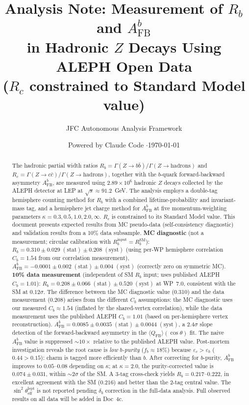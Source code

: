 \documentclass[11pt,a4paper]{article}
\title{Analysis Note: Measurement of $R_b$ and $A_\mathrm{FB}^b$\\
in Hadronic $Z$ Decays Using ALEPH Open Data\\
{\normalsize ($R_c$ constrained to Standard Model value)}}
\author{JFC Autonomous Analysis Framework}
\date{Powered by Claude Code \quad$\cdot$\quad \today}
\begin{document}
\maketitle

\begin{abstract}
The hadronic partial width ratios $R_b = \Gamma(Z \to b\bar{b})/\Gamma(Z \to \mathrm{hadrons})$
and $R_c = \Gamma(Z \to c\bar{c})/\Gamma(Z \to \mathrm{hadrons})$, together with the
$b$-quark forward-backward asymmetry $A_\mathrm{FB}^b$, are measured using $2.89 \times 10^6$
hadronic $Z$ decays collected by the ALEPH detector at LEP at $\sqrt{s} \approx 91.2$~GeV.
The analysis employs a double-tag hemisphere counting method for $R_b$ with a combined
lifetime-probability and invariant-mass tag, and a hemisphere jet charge method for
$A_\mathrm{FB}^b$ at five momentum-weighting parameters $\kappa = 0.3, 0.5, 1.0, 2.0, \infty$.
$R_c$ is constrained to its Standard Model value.
This document presents expected results from MC pseudo-data (self-consistency diagnostic)
and validation results from a 10\% data subsample.
\textbf{MC diagnostic} (not a measurement; circular calibration with $R_b^\mathrm{input} = R_b^\mathrm{SM}$):
$R_b = 0.310 \pm 0.029\;\mathrm{(stat)} \pm 0.208\;\mathrm{(syst)}$
(using per-WP hemisphere correlation $C_b = 1.54$ from our correlation measurement),
$A_\mathrm{FB}^b = -0.0001 \pm 0.002\;\mathrm{(stat)} \pm 0.004\;\mathrm{(syst)}$
(correctly zero on symmetric MC).
\textbf{10\% data measurement} (independent of SM $R_b$ input; uses published ALEPH $C_b = 1.01$):
$R_b = 0.208 \pm 0.066\;\mathrm{(stat)} \pm 0.520\;\mathrm{(syst)}$
at WP~7.0, consistent with the SM at $0.12\sigma$.
The difference between the MC diagnostic value (0.310) and the data measurement (0.208)
arises from the different $C_b$ assumptions: the MC diagnostic uses our measured
$C_b \approx 1.54$ (inflated by the shared-vertex correlation), while the data
measurement uses the published ALEPH $C_b = 1.01$ (based on per-hemisphere vertex reconstruction).
$A_\mathrm{FB}^b = 0.0085 \pm 0.0035\;\mathrm{(stat)} \pm 0.0044\;\mathrm{(syst)}$,
a $2.4\sigma$ slope detection of the forward-backward asymmetry in the
$\langle Q_\mathrm{FB} \rangle(\cos\theta)$ fit.
The naive $A_\mathrm{FB}^b$ value is suppressed $\sim 10\times$ relative to the
published ALEPH value. Post-mortem investigation reveals the root cause is
\emph{low $b$-purity} ($f_b \approx 18\%$) because $\varepsilon_c > \varepsilon_b$
($0.44 > 0.15$): charm is tagged more efficiently than $b$. After correcting for
$b$-purity, $A_\mathrm{FB}^b$ improves to $0.05$--$0.08$ depending on $\kappa$;
at $\kappa = 2.0$, the purity-corrected value is $0.074 \pm 0.031$, within
$\sim 2\sigma$ of the SM.
A 3-tag cross-check yields $R_b = 0.217$--$0.222$, in excellent agreement with the SM
($0.216$) and better than the 2-tag central value.
The $\sin^2\theta_\mathrm{eff}^\mathrm{lept}$ is not reported pending
$\delta_b$ correction in the full-data analysis.
Full observed results on all data will be added in Doc~4c.
\end{abstract}
\end{document}
